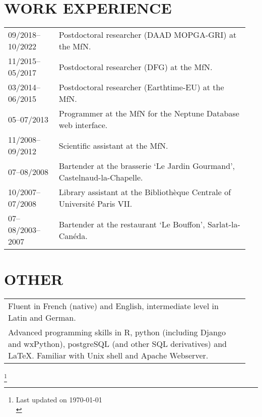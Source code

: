 \documentclass[11pt, a4paper]{article}
\begin{document}
\section{WORK EXPERIENCE}
\begin{longtable}{@{}p{0.2\linewidth} P{0.75\linewidth}@{}}
09/2018--10/2022 & Postdoctoral researcher (DAAD MOPGA-GRI) at the MfN.\\
11/2015--05/2017 & Postdoctoral researcher (DFG) at the MfN.\\
03/2014--06/2015 & Postdoctoral researcher (Earthtime-EU) at the MfN.\\
05--07/2013 & Programmer at the MfN for the Neptune Database web interface.\\
11/2008--09/2012 & Scientific assistant at the MfN.\\
07--08/2008 & Bartender at the brasserie `Le Jardin Gourmand', Castelnaud-la-Chapelle.\\
10/2007--07/2008 & Library assistant at the Biblioth\`{e}que Centrale of Universit\'{e} Paris VII.\\
07--08/2003--2007 & Bartender at the restaurant `Le Bouffon', Sarlat-la-Can\'{e}da.\\
\end{longtable}

\section{OTHER}
\begin{longtable}{@{}p{0.94\linewidth} p{0.01\linewidth}@{}}
Fluent in French (native) and English, intermediate level in Latin and German. & \\
Advanced programming skills in R, python (including Django and wxPython), postgreSQL (and other SQL derivatives) and \LaTeX. Familiar with Unix shell and Apache Webserver. & \\
\end{longtable}

\vfill

{\let\thefootnote\relax\footnote{Last updated on \today\\
\theendnotes}}
\end{document}
